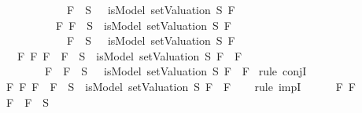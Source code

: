 \begin{isabellebody}
\ \ \ \ \ \ \ \ \ \ \ {\isacharparenleft}\isactrlbold {\isasymnot}\ F{}\ {\isasymin}\ S\ {\isasymlongrightarrow}\ {\isasymnot}\ isModel\ {\isacharparenleft}setValuation\ S{\isacharparenright}\ F{}{\isacharparenright}{\isachardoublequoteclose}\ \isanewline
\ \ \ \ \ \ \ \ \ \ {\isachardoublequoteopen}{\isasymAnd}F{}{\isachardot}\ {\isacharparenleft}F{}\ {\isasymin}\ S\ {\isasymlongrightarrow}\ isModel\ {\isacharparenleft}setValuation\ S{\isacharparenright}\ F{}{\isacharparenright}\ {\isasymand}\isanewline
\ \ \ \ \ \ \ \ \ \ \ {\isacharparenleft}\isactrlbold {\isasymnot}\ F{}\ {\isasymin}\ S\ {\isasymlongrightarrow}\ {\isasymnot}\ isModel\ {\isacharparenleft}setValuation\ S{\isacharparenright}\ F{}{\isacharparenright}{\isachardoublequoteclose}\isanewline
\ \ \ {\isachardoublequoteopen}{\isasymAnd}F{}\ F{}{\isachardot}\ {\isacharparenleft}F{}\ \isactrlbold {\isasymrightarrow}\ F{}\ {\isasymin}\ S\ {\isasymlongrightarrow}\ isModel\ {\isacharparenleft}setValuation\ S{\isacharparenright}\ {\isacharparenleft}F{}\ \isactrlbold {\isasymrightarrow}\ F{}{\isacharparenright}{\isacharparenright}\ \isanewline
\ \ \ \ \ \ {\isasymand}\ {\isacharparenleft}\isactrlbold {\isasymnot}\ {\isacharparenleft}F{}\ \isactrlbold {\isasymrightarrow}\ F{}{\isacharparenright}\ {\isasymin}\ S\ {\isasymlongrightarrow}\ {\isasymnot}\ isModel\ {\isacharparenleft}setValuation\ S{\isacharparenright}\ {\isacharparenleft}F{}\ \isactrlbold {\isasymrightarrow}\ F{}{\isacharparenright}{\isacharparenright}{\isachardoublequoteclose}\isanewline
%
\isadelimproof
%
\endisadelimproof
%
\isatagproof
{}\isamarkupfalse%
\ {\isacharparenleft}rule\ conjI{\isacharparenright}\isanewline
\ \ \isamarkupfalse%
\ {\isachardoublequoteopen}{\isasymAnd}F{}\ F{}{\isachardot}\ F{}\ \isactrlbold {\isasymrightarrow}\ F{}\ {\isasymin}\ S\ {\isasymlongrightarrow}\ isModel\ {\isacharparenleft}setValuation\ S{\isacharparenright}\ {\isacharparenleft}F{}\ \isactrlbold {\isasymrightarrow}\ F{}{\isacharparenright}{\isachardoublequoteclose}\isanewline
\ \ \isamarkupfalse%
\ {\isacharparenleft}rule\ impI{\isacharparenright}\isanewline
\ \ \ \ \isamarkupfalse%
\ F{}\ F{}\isanewline
\ \ \ \ \isamarkupfalse%
\ {\isachardoublequoteopen}F{}\ \isactrlbold {\isasymrightarrow}\ F{}\ {\isasymin}\ S{\isachardoublequoteclose}\isanewline

\end{isabellebody}
